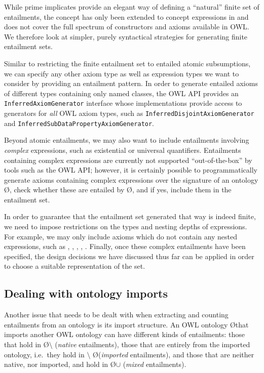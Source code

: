 While prime implicates provide an elegant way of defining a \enquote{natural} finite set of entailments, the concept has only been extended to concept expressions in  and does not cover the full spectrum of constructors and axioms available in OWL. We therefore look at simpler, purely syntactical strategies for generating finite entailment sets.

Similar to restricting the finite entailment set to entailed atomic subsumptions, we can specify any other axiom type as well as expression types we want to consider by providing an entailment pattern. In order to generate entailed axioms of different types containing only named classes, the OWL API provides an \texttt{InferredAxiomGenerator} interface whose implementations provide access to generators for \emph{all} OWL axiom types, such as \texttt{InferredDisjointAxiomGenerator} and \texttt{InferredSubDataPropertyAxiomGenerator}.

Beyond atomic entailments, we may also want to include entailments involving \emph{complex} expressions, such as existential or universal quantifiers. Entailments containing complex expressions are currently not supported \enquote{out-of-the-box} by tools such as the OWL API; however, it is certainly possible to programmatically generate axioms containing complex expressions over the signature of an ontology \O, check whether these are entailed by \O, and if yes, include them in the entailment set. 

In order to guarantee that the entailment set generated that way is indeed finite, we need to impose restrictions on the types and nesting depths of expressions. For example, we may only include axioms which do not contain any nested expressions, such as , , , , . Finally, once these complex entailments have been specified, the design decisions we have discussed thus far can be applied in order to choose a suitable representation of the set.



\subsection{Dealing with ontology imports}

Another issue that needs to be dealt with when extracting and counting entailments from an ontology is its import structure. An OWL ontology \O  that imports another OWL ontology \oprime can have different kinds of entailments: those that hold in \O $\setminus$ \oprime (\emph{native} entailments),  those that are entirely from the imported ontology, i.e.\ they hold in  \oprime $\setminus$ \O (\emph{imported} entailments), and those that are neither native, nor imported, and hold in \O $\cup$ \oprime (\emph{mixed} entailments). 

